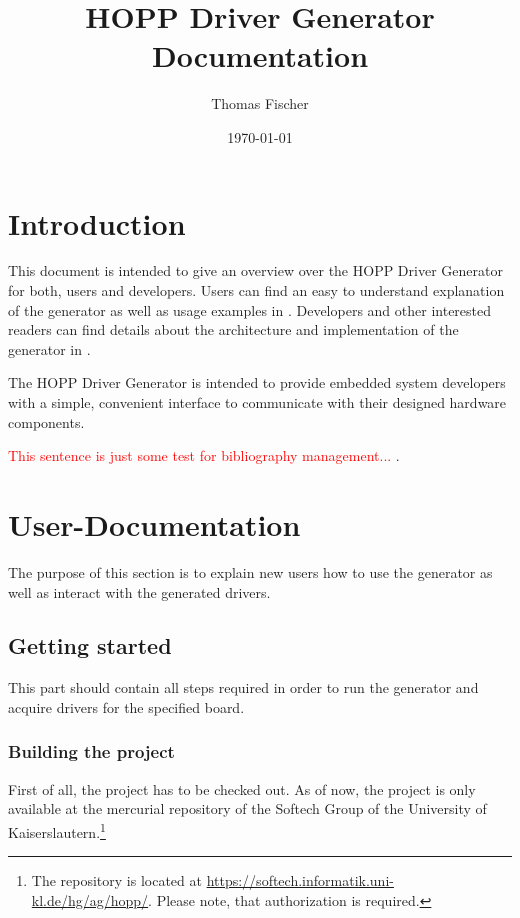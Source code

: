 \documentclass{report}
\begin{document}
\title{HOPP Driver Generator Documentation}
\author{Thomas Fischer}
\date{\today}

\maketitle
\thispagestyle{empty}
\newpage

\tableofcontents
\thispagestyle{empty}
\newpage

\chapter{Introduction}
This document is intended to give an overview over the HOPP Driver Generator for both, users and developers. Users can find an easy to understand explanation of the generator as well as usage examples in . Developers and other interested readers can find details about the architecture and implementation of the generator in .

The HOPP Driver Generator is intended to provide embedded system developers %
with a simple, convenient interface to communicate with their designed hardware components. %

\textcolor{red}{This sentence is just some test for bibliography management...} \cite{fischer12}.
\chapter{User-Documentation}
\label{sec:userDoc}
The purpose of this section is to explain new users how to use the generator as well as interact with the generated drivers.

\section{Getting started}
This part should contain all steps required in order to run the generator and acquire drivers for the specified board.

\subsection{Building the project}
First of all, the project has to be checked out. As of now, the project is only available at the mercurial repository of the Softech Group of the University of Kaiserslautern.\footnote{The repository is located at \url{https://softech.informatik.uni-kl.de/hg/ag/hopp/}. Please note, that authorization is required.}
\end{document}
